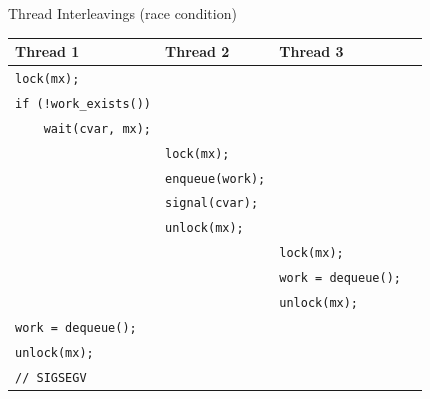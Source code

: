\documentclass[xcolor=dvipsnames]{beamer}
\begin{document}
\begin{frame}{Thread Interleavings (race condition)}
	\begin{center}
		\begin{tabular}{|l|l|l|}
			\hline
			\cellcolor{thread1} {\bf Thread 1} & \cellcolor{thread2} {\bf Thread 2} & \cellcolor{thread3} {\bf Thread 3} \\
			\hline
			\small \texttt{lock(mx);} & & \\
			\small \texttt{if~(!work\_exists())} & & \\
			\small \texttt{~~~~wait(cvar,~mx);} & & \\
			
			& \small \texttt{lock(mx);} & \\
			& \small \texttt{enqueue(work);} & \\
			& \small \texttt{signal(cvar);} & \\
			& \small \texttt{unlock(mx);} & \\
			
			& & \small \texttt{lock(mx);} \\
			& & \small \texttt{work~=~dequeue();~~} \\
			& & \small \texttt{unlock(mx);} \\

			\small \texttt{work~=~dequeue();} & & \\
			\small \texttt{unlock(mx);} & & \\
			\small \texttt{//~SIGSEGV} {\large \frownie}& & \\
			\hline
		\end{tabular}
	\end{center}
\end{frame}

\newcommand\related[1]{\textsuperscript{\em [#1]}}
\end{document}
